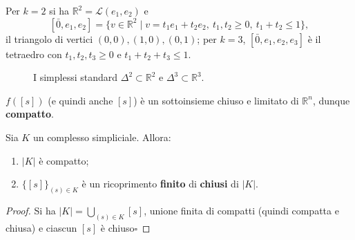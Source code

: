 Per $k=2$ si ha $\mathbb{R}^2 = \mathcal{L}(e_1, e_2)$ e
\[
[\bar{0}, e_1, e_2] = \{ v \in \mathbb{R}^2 \mid v = t_1 e_1 + t_2 e_2,\ t_1, t_2 \geqslant 0,\ t_1 + t_2 \leqslant 1 \},
\]
il triangolo di vertici $(0,0), (1,0), (0,1)$; per $k = 3$, $[\bar{0}, e_1, e_2, e_3]$ \`e il tetraedro con $t_1, t_2, t_3 \geqslant 0$ e $t_1 + t_2 + t_3 \leqslant 1$.

\begin{figure}[H]
    \centering
    \caption{I simplessi standard $\Delta^2 \subset \mathbb{R}^2$ e $\Delta^3 \subset \mathbb{R}^3$.}
\end{figure}

\begin{observacion}[Conseguenza]
$f([s])$ (e quindi anche $[s]$) \`e un sottoinsieme chiuso e limitato di $\mathbb{R}^n$, dunque \textbf{compatto}.
\end{observacion}

\begin{prop}
Sia $K$ un complesso simpliciale. Allora:
\begin{enumerate}
    \item[a)] $|K|$ \`e compatto;
    \item[b)] $\{ [s] \}_{(s) \in K}$ \`e un ricoprimento \textbf{finito} di \textbf{chiusi} di $|K|$.
\end{enumerate}
\end{prop}
\begin{proof}
Si ha $|K| = \bigcup_{(s) \in K} [s]$, unione finita di compatti (quindi compatta e chiusa) e ciascun $[s]$ \`e chiuso\hfill$\square$
\end{proof}

